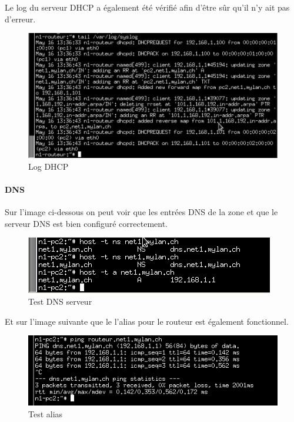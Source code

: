 \documentclass{article}
\begin{document}
Le log du serveur DHCP a également été vérifié afin d'être sûr qu'il n'y ait pas d'erreur.

\begin{figure}[!ht]
	\centering
	\includegraphics{./captures/2-log-dhcp.png}
	\caption{Log DHCP}
	\label{fig:Log DHCP}
\end{figure}

\paragraph{DNS}

Sur l'image ci-dessous on peut voir que les entrées DNS de la zone et que le serveur DNS est bien configuré correctement.

\begin{figure}[!ht]
	\centering
	\includegraphics{./captures/1-testrouteur-dns1-pc2.png}
	\caption{Test DNS serveur}
	\label{fig:Test DNS serveur}
\end{figure}

Et sur l'image suivante que le l'alias pour le routeur est également fonctionnel.

\begin{figure}[!ht]
	\centering
	\includegraphics{./captures/alias-routeur.png}
	\caption{Test alias}
	\label{fig:Test alias}
\end{figure}
\end{document}
